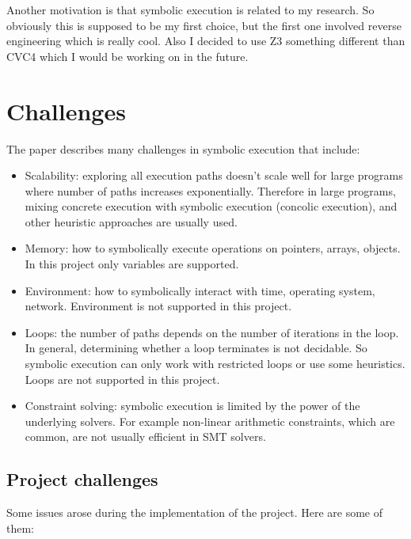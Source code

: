 \documentclass[12pt,a4paper]{article}
\begin{document}
Another motivation is that symbolic execution is related to my research. So obviously this is supposed to be my first choice, but the first one involved reverse engineering which is really cool. Also I decided to use Z3 something different than CVC4 which I would be working on in the future. 
\section{Challenges} 

The paper \cite{paper} describes many challenges in symbolic execution that include:

\begin{itemize}
\item Scalability: exploring all execution paths doesn't scale well for large programs where number of paths increases exponentially. Therefore in large programs, mixing concrete execution with symbolic execution (concolic execution), and other heuristic approaches are usually used. 

\item Memory: how to symbolically execute operations on pointers, arrays, objects. In this project only variables are supported. 
\item Environment: how to symbolically interact with time, operating system, network. Environment is not supported in this project.
\item Loops: the number of paths depends on the number of iterations in the loop. In general, determining whether a loop terminates is not decidable. So symbolic execution can only work with restricted loops or use some heuristics. Loops are not supported in this project.
\item Constraint solving:  symbolic execution is limited by the power of the underlying solvers. For example non-linear arithmetic constraints, which are common, are not usually efficient in SMT solvers. 

\end{itemize}

\subsection{Project challenges}

Some issues arose during the implementation of the project. Here are some of them:
\end{document}
